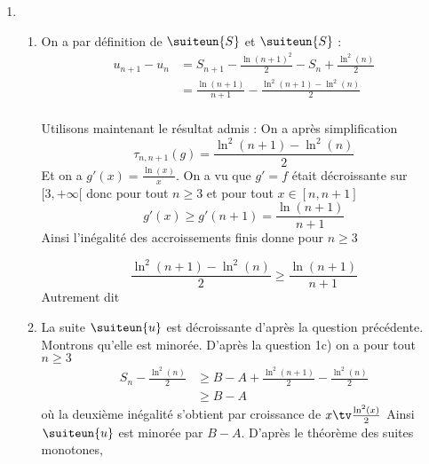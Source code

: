 \documentclass[a4paper, 11pt,reqno]{article}
\begin{document}
\begin{correction}
\begin{enumerate}
\begin{enumerate}
On obtient donc 

$$\int_4^{n+1} \frac{\ln(x)}{x} dx \leq \sum_{k=4}^n \frac{\ln(k)}{k}\leq 
\int_3^{n} \frac{\ln(x)}{x} dx $$
Or, on  a 
\begin{align*}
 \int_4^{n+1} \frac{\ln (x)}{x}  &= [\frac{1}{2}\ln^2(x)]_4^{n+1}\\
 												&= \frac{1}{2}\ln^2(n+1)- \frac{1}{2}\ln^2(4)\\
 												&= \frac{1}{2}\ln^2(n+1)-2\ln^2(2)
\end{align*}
et 
$$\sum_{k=4}^n \frac{\ln(k)}{k} = S_n - \frac{\ln(3)}{3}-\frac{\ln(2)}{2}$$
et enfin
\begin{align*}
 \int_3^{n} \frac{\ln (x)}{x}  &= [\frac{1}{2}\ln^2(x)]_3^{n}\\
 												&= \frac{1}{2}\ln^2(n)- \frac{1}{2}\ln^2(3)
\end{align*}

On peut donc prendre $A= 2\ln^2(2)$, $B= \frac{\ln(3)}{3}+\frac{\ln(2)}{2}$ et  $C= \frac{1}{2}\ln^2(3)$ et on obtient 
\item $n \tv \frac{\ln^2(n+1)}{2}$ tend vers $+\infty $ en $+\infty$. Ainsi 
par comparaison 


\end{enumerate}
\item \begin{enumerate}
\item On a par définition de $\suiteun{S}$ et $\suiteun{S}$ :
\begin{align*}
u_{n+1} -u_n&= S_{n+1} -\frac{\ln(n+1)^2}{2}- S_n +\frac{\ln^2(n)}{2}\\
					&= \frac{\ln(n+1)}{n+1}- \frac{\ln^2(n+1)-\ln^2(n)}{2}\\
\end{align*}

Utilisons maintenant le résultat admis : 
On a après simplification $$\tau_{n,n+1}(g) =  \frac{\ln^2(n+1) -\ln^2(n)}{2}$$
Et on a $g'(x)=\frac{\ln(x)}{x}$. On a vu que $g'=f$ était décroissante sur $[ 3,+\infty[$
donc pour tout $n\geq 3$ et pour tout $x\in [n,n+1]$ 
$$g'(x) \geq g'(n+1) =  \frac{\ln(n+1)}{n+1}$$
Ainsi l'inégalité des accroissements finis donne pour $n\geq3$

$$ \frac{\ln^2(n+1) -\ln^2(n)}{2} \geq  \frac{\ln(n+1)}{n+1}$$
Autrement dit 
\item La suite $\suiteun{u} $ est décroissante d'après la question précédente. Montrons qu'elle est minorée. 
D'après la question 1c) on a pour tout $n\geq 3$
\begin{align*}
S_n -\frac{\ln^2(n)}{2}& \geq B -A + \frac{\ln^2(n+1)}{2} -\frac{\ln^2(n)}{2} \\
								&\geq B-A
\end{align*}
où la deuxième inégalité s'obtient par croissance de $x\tv \frac{\ln^2(x)}{2}$ 
Ainsi $\suiteun{u}$ est minorée par $B-A$. D'après le théorème des suites monotones, 




\end{enumerate}
\end{enumerate}
\end{correction}
\end{document}
